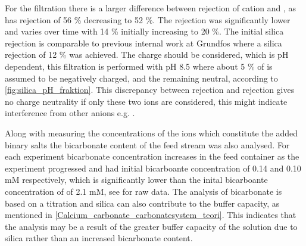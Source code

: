 For the  filtration there is a larger difference between rejection of cation  and , as  has rejection of 56 \% decreasing to 52 \%. 
The  rejection was significantly lower and varies over time with 14 \% initially increasing to 20 \%. 
The initial silica rejection is comparable to previous internal work at Grundfos \citep{Sebastians_master_2020} where a silica rejection of 12 \% was achieved.
The   charge should be considered, which is pH dependent, this filtration is performed with pH 8.5 where about 5 \% of  is assumed to be negatively charged, and the remaining neutral, according to \cref{fig:silica_pH_fraktion}.
This discrepancy between  rejection and  rejection gives no charge neutrality if only these two ions are considered, this might indicate interference from other anions e.g. . 





Along with measuring the concentrations of the ions which constitute the added binary salts the bicarbonate content of the feed stream was also analysed. 
For each experiment bicarbonate concentration increases in the feed container as the experiment progressed  and  had initial bicarboante concentration of 0.14 and 0.10 mM respectively, which is significantly lower than the inital bicarboante concentration of  of 2.1 mM, see  for raw data. 
The analysis of bicarbonate is based on a titration and  silica can also contribute to the buffer capacity, as mentioned in \cref{Calcium_carbonate_carbonatesystem_teori}.  
This indicates that the analysis may be a result of the greater buffer capacity of the solution due to silica rather than an increased bicarbonate content.  


